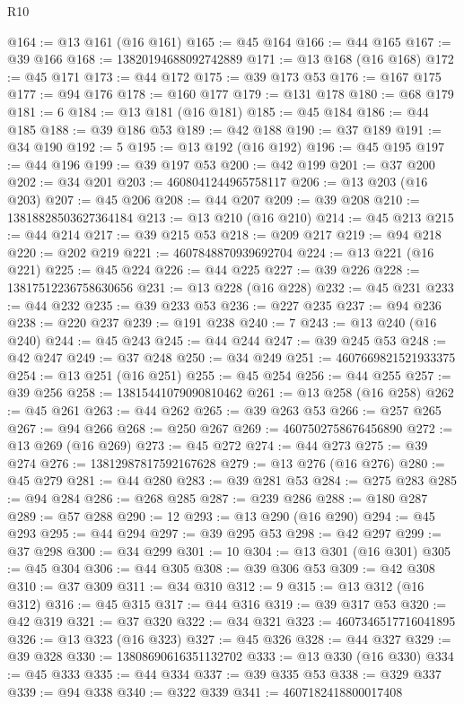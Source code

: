\begin{lexlean}{R10}
\begin{coremodule}
@164 := @13 @161 (@16 @161)
@165 := @45 @164
@166 := @44 @165
@167 := @39 @166
@168 := 13820194688092742889
@171 := @13 @168 (@16 @168)
@172 := @45 @171
@173 := @44 @172
@175 := @39 @173 @53
@176 := @167 @175
@177 := @94 @176
@178 := @160 @177
@179 := @131 @178
@180 := @68 @179
@181 := 6
@184 := @13 @181 (@16 @181)
@185 := @45 @184
@186 := @44 @185
@188 := @39 @186 @53
@189 := @42 @188
@190 := @37 @189
@191 := @34 @190
@192 := 5
@195 := @13 @192 (@16 @192)
@196 := @45 @195
@197 := @44 @196
@199 := @39 @197 @53
@200 := @42 @199
@201 := @37 @200
@202 := @34 @201
@203 := 4608041244965758117
@206 := @13 @203 (@16 @203)
@207 := @45 @206
@208 := @44 @207
@209 := @39 @208
@210 := 13818828503627364184
@213 := @13 @210 (@16 @210)
@214 := @45 @213
@215 := @44 @214
@217 := @39 @215 @53
@218 := @209 @217
@219 := @94 @218
@220 := @202 @219
@221 := 4607848870939692704
@224 := @13 @221 (@16 @221)
@225 := @45 @224
@226 := @44 @225
@227 := @39 @226
@228 := 13817512236758630656
@231 := @13 @228 (@16 @228)
@232 := @45 @231
@233 := @44 @232
@235 := @39 @233 @53
@236 := @227 @235
@237 := @94 @236
@238 := @220 @237
@239 := @191 @238
@240 := 7
@243 := @13 @240 (@16 @240)
@244 := @45 @243
@245 := @44 @244
@247 := @39 @245 @53
@248 := @42 @247
@249 := @37 @248
@250 := @34 @249
@251 := 4607669821521933375
@254 := @13 @251 (@16 @251)
@255 := @45 @254
@256 := @44 @255
@257 := @39 @256
@258 := 13815441079090810462
@261 := @13 @258 (@16 @258)
@262 := @45 @261
@263 := @44 @262
@265 := @39 @263 @53
@266 := @257 @265
@267 := @94 @266
@268 := @250 @267
@269 := 4607502758676456890
@272 := @13 @269 (@16 @269)
@273 := @45 @272
@274 := @44 @273
@275 := @39 @274
@276 := 13812987817592167628
@279 := @13 @276 (@16 @276)
@280 := @45 @279
@281 := @44 @280
@283 := @39 @281 @53
@284 := @275 @283
@285 := @94 @284
@286 := @268 @285
@287 := @239 @286
@288 := @180 @287
@289 := @57 @288
@290 := 12
@293 := @13 @290 (@16 @290)
@294 := @45 @293
@295 := @44 @294
@297 := @39 @295 @53
@298 := @42 @297
@299 := @37 @298
@300 := @34 @299
@301 := 10
@304 := @13 @301 (@16 @301)
@305 := @45 @304
@306 := @44 @305
@308 := @39 @306 @53
@309 := @42 @308
@310 := @37 @309
@311 := @34 @310
@312 := 9
@315 := @13 @312 (@16 @312)
@316 := @45 @315
@317 := @44 @316
@319 := @39 @317 @53
@320 := @42 @319
@321 := @37 @320
@322 := @34 @321
@323 := 4607346517716041895
@326 := @13 @323 (@16 @323)
@327 := @45 @326
@328 := @44 @327
@329 := @39 @328
@330 := 13808690616351132702
@333 := @13 @330 (@16 @330)
@334 := @45 @333
@335 := @44 @334
@337 := @39 @335 @53
@338 := @329 @337
@339 := @94 @338
@340 := @322 @339
@341 := 4607182418800017408

\end{coremodule}
\end{lexlean}
